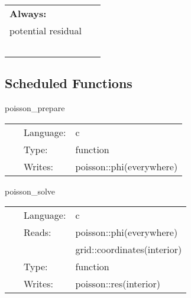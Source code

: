 \hspace{5mm}

 \begin{tabular*}{160mm}{ll} 

{\bf Always:}&  ~ \\ 
 potential residual & ~\\ 
~ & ~\\ 
\end{tabular*} 


\subsection*{Scheduled Functions}
\vspace{5mm}


\hspace{5mm} poisson\_prepare 

\hspace{5mm}{\it set up initial guess for initial data } 


\hspace{5mm}

 \begin{tabular*}{160mm}{cll} 
~ & Language:  & c \\ 
~ & Type:  & function \\ 
~ & Writes:  & poisson::phi(everywhere) \\ 
\end{tabular*} 


\vspace{5mm}


\hspace{5mm} poisson\_solve 

\hspace{5mm}{\it calculate uniform charge initial data } 


\hspace{5mm}

 \begin{tabular*}{160mm}{cll} 
~ & Language:  & c \\ 
~ & Reads:  & poisson::phi(everywhere) \\ 
~& ~ &grid::coordinates(interior)\\ 
~ & Type:  & function \\ 
~ & Writes:  & poisson::res(interior) \\ 
\end{tabular*} 


